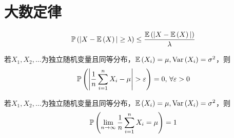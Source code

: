 
\section{大数定律}
\begin{theorem}
\[\mathbb{P}\left(|X-\mathbb{E}\left(X\right)|\geq\lambda\right)\leq\dfrac{\mathbb{E}\left(|X-\mathbb{E}\left(X\right)|\right)}{\lambda}\]
\end{theorem}
\begin{theorem}[弱大数定律]
若$X_1,X_2,\ldots$为独立随机变量且同等分布，$\mathbb{E}\left(X_i\right)=\mu,\mathrm{Var}\left(X_i\right)=\sigma^2$，则
\[\pr{\lra{\dfrac{1}{n}\sum_{i=1}^nX_i-\mu}>\eps}=0,\,\forall\eps>0\]
\end{theorem}
\begin{theorem}[强大数定律]
若$X_1,X_2,\ldots$为独立随机变量且同等分布，$\mathbb{E}\left(X_i\right)=\mu,\mathrm{Var}\left(X_i\right)=\sigma^2$，则
\[\mathbb{P}\left(\lim_{n\to\infty}\dfrac{1}{n}\sum_{i=1}^nX_i=\mu\right)=1\]
\end{theorem}